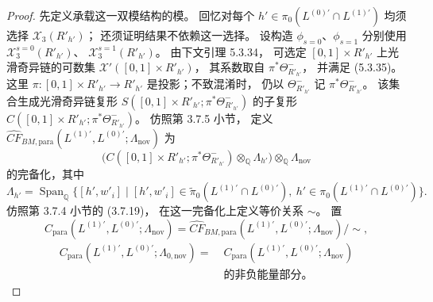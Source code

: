 \begin{proof}
先定义承载这一双模结构的模。
回忆对每个
$h'\in\pi_0(L^{(0)\prime}\cap L^{(1)\prime})$
均须选择
$\mathcal X_3(R'_{h'})$；
还须证明结果不依赖这一选择。
设构造 $\phi_{s=0}$、$\phi_{s=1}$
分别使用
$\mathcal X_3^{s=0}(R'_{h'})$、
$\mathcal X_3^{s=1}(R'_{h'})$。
由下文引理 5.3.34，
可选定 $[0,1]\times R'_{h'}$
上光滑奇异链的可数集
$\mathcal X'([0,1]\times R'_{h'})$，
其系数取自 $\pi^*\Theta^-_{R'_{h'}}$，
并满足 (5.3.35)。
这里
$\pi\colon[0,1]\times R'_{h'}\to R'_{h'}$
是投影；不致混淆时，
仍以 $\Theta^-_{R'_{h'}}$
记 $\pi^*\Theta^-_{R'_{h'}}$。
该集合生成光滑奇异链复形
$S([0,1]\times R'_{h'};
\pi^*\Theta^-_{R'_{h'}})$
的子复形
$C([0,1]\times R'_{h'};
\pi^*\Theta^-_{R'_{h'}})$。
仿照第 3.7.5 小节，
定义
$\widehat{CF}_{BM,\mathrm{para}}
(L^{(1)\prime},L^{(0)\prime};
\Lambda_{\mathrm{nov}})$
为
\[
\bigl(
C([0,1]\times R'_{h'};
\pi^*\Theta^-_{R'_{h'}})
\otimes_{\mathbb Q}\Lambda_{h'}
\bigr)\otimes_{\mathbb Q}\Lambda_{\mathrm{nov}}
\]
的完备化，其中
\[
\Lambda_{h'}
=\operatorname{Span}_{\mathbb Q}
\bigl\{[h',w'_i]\mid
[h',w'_i]\in
\widetilde\pi_0(L^{(1)\prime}
\cap L^{(0)\prime}),\
h'\in\pi_0(L^{(1)\prime}
\cap L^{(0)\prime})\bigr\}.
\]
仿照第 3.7.4 小节的 (3.7.19)，
在这一完备化上定义等价关系 $\sim$。
置
\[
C_{\mathrm{para}}
(L^{(1)\prime},L^{(0)\prime};
\Lambda_{\mathrm{nov}})
=\widehat{CF}_{BM,\mathrm{para}}
(L^{(1)\prime},L^{(0)\prime};
\Lambda_{\mathrm{nov}})/\sim,
\]
\begin{equation}
\begin{aligned}
C_{\mathrm{para}}
(L^{(1)\prime},L^{(0)\prime};
\Lambda_{0,\mathrm{nov}})
=\;&C_{\mathrm{para}}
(L^{(1)\prime},L^{(0)\prime};
\Lambda_{\mathrm{nov}})\\
&\text{的非负能量部分。}
\end{aligned}
\tag{5.3.30}\label{eq:5-3-30}
\end{equation}


\end{proof}
